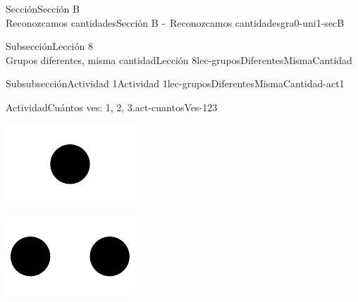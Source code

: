 \begin{sectionptx}{Sección}{{\Large Sección B\\}Reconozcamos cantidades}{}{Sección B -~Reconozcamos cantidades}{}{}{gra0-uni1-secB}
\begin{subsectionptx}{Subsección}{{\normalsize Lección 8\\[-0.05cm]}Grupos diferentes, misma cantidad}{}{Lección 8}{}{}{lec-gruposDiferentesMismaCantidad}
\begin{subsubsectionptx}{Subsubsección}{Actividad 1}{}{Actividad 1}{}{}{lec-gruposDiferentesMismaCantidad-act1}
\begin{activity}{Actividad}{Cuántos ves: 1, 2, 3.}{act-cuantosVes-123}
\begin{sidebyside}{3}{0.0416666666666667}{0.0416666666666667}{0.0833333333333333}
\begin{sbspanel}{0.25}
\includegraphics[max width=\linewidth, center]{external/svg-source/tikz-file-136322.pdf}
\end{sbspanel}%
\begin{sbspanel}{0.25}%
\includegraphics[max width=\linewidth, center]{external/svg-source/tikz-file-136323.pdf}
\end{sbspanel}%
\begin{sbspanel}{0.25}%

\end{sbspanel}
\end{sidebyside}
\end{activity}
\end{subsubsectionptx}
\end{subsectionptx}
\end{sectionptx}
